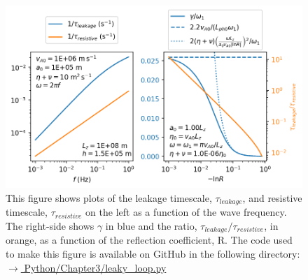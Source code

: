 \begin{figure}
    \vspace{-20pt}
    \centering
    \includegraphics[width=\textwidth,height=0.85\textheight,keepaspectratio]{figures/chapter03/leaky_loop.png}
    \vspace{-35pt}
    \caption{This figure shows plots of the leakage timescale, $\tau_{leakage}$, and resistive timescale, $\tau_{resistive}$ on the left as a function of the wave frequency. The right-side shows $\gamma$ in blue and the ratio, $\tau_{leakage}/\tau_{resistive}$, in orange, as a function of the reflection coefficient, R. The code used to make this figure is available on GitHub in the following directory:\newline
    \href{https://github.com/aleksyprok/apkp_thesis/blob/main/Python/Chapter3/leaky_loop.py}{$\rightarrow$ Python/Chapter3/leaky\_loop.py}}
    \label{fig:chap_3_leaky_loop}
    \vspace{-15pt}
\end{figure}

